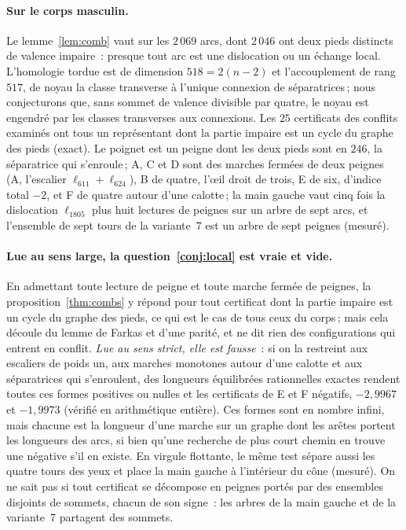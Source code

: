 \documentclass[11pt,a4paper]{article}
\begin{document}
\paragraph{Sur le corps masculin.}
Le lemme~\ref{lem:comb} vaut sur les $2\,069$ arcs, dont $2\,046$ ont deux
pieds distincts de valence impaire~: presque tout arc est une dislocation ou
un échange local. L'homologie tordue est de dimension $518 = 2(n - 2)$ et
l'accouplement de rang $517$, de noyau la classe transverse à l'unique
connexion de séparatrices\,; nous conjecturons que, sans sommet de valence
divisible par quatre, le noyau est engendré par les classes transverses aux
connexions. Les $25$ certificats des conflits examinés ont tous un
représentant dont la partie impaire est un cycle du graphe des pieds (exact).
Le poignet est un peigne dont les deux pieds sont en $246$, la séparatrice qui
s'enroule\,; A, C et D sont des marches fermées de deux peignes (A,
l'escalier $\ell_{611} + \ell_{624}$), B de quatre, l'œil droit de trois, E de
six, d'indice total $-2$, et F de quatre autour d'une calotte\,; la main
gauche vaut cinq fois la dislocation $\ell_{1805}$ plus huit lectures de
peignes sur un arbre de sept arcs, et l'ensemble de sept tours de la
variante~7 est un arbre de sept peignes (mesuré).

\paragraph{Lue au sens large, la question~\ref{conj:local} est vraie et vide.}
En admettant toute lecture de peigne et toute marche fermée de peignes, la
proposition~\ref{thm:combs} y répond pour tout certificat dont la partie
impaire est un cycle du graphe des pieds, ce qui est le cas de tous ceux du
corps\,; mais cela découle du lemme de Farkas et d'une parité, et ne dit rien
des configurations qui entrent en conflit. \emph{Lue au sens strict, elle est
fausse}~: si on la restreint aux escaliers de poids un, aux marches monotones
autour d'une calotte et aux séparatrices qui s'enroulent, des longueurs
équilibrées rationnelles exactes rendent toutes ces formes positives ou nulles
et les certificats de E et F négatifs, $-2,9967$ et $-1,9973$ (vérifié en
arithmétique entière). Ces formes sont en nombre infini, mais chacune est la
longueur d'une marche sur un graphe dont les arêtes portent les longueurs des
arcs, si bien qu'une recherche de plus court chemin en trouve une négative
s'il en existe. En virgule flottante, le même test sépare aussi les quatre
tours des yeux et place la main gauche à l'intérieur du cône (mesuré). On ne
sait pas si tout certificat se décompose en peignes portés par des ensembles
disjoints de sommets, chacun de son signe~: les arbres de la main gauche et de
la variante~7 partagent des sommets.
\end{document}
